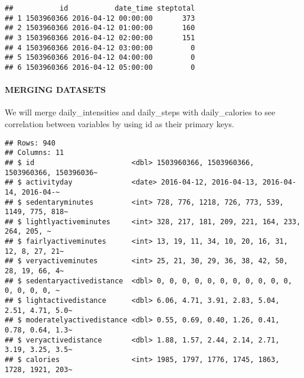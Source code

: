 \documentclass[
]{article}
\newenvironment{Shaded}{\begin{snugshade}}{\end{snugshade}}
\newcommand{\AttributeTok}[1]{\textcolor[rgb]{0.13,0.29,0.53}{#1}}
\newcommand{\FunctionTok}[1]{\textcolor[rgb]{0.13,0.29,0.53}{\textbf{#1}}}
\newcommand{\NormalTok}[1]{#1}
\newcommand{\OtherTok}[1]{\textcolor[rgb]{0.56,0.35,0.01}{#1}}
\newcommand{\SpecialCharTok}[1]{\textcolor[rgb]{0.81,0.36,0.00}{\textbf{#1}}}
\newcommand{\StringTok}[1]{\textcolor[rgb]{0.31,0.60,0.02}{#1}}
\begin{document}
\begin{verbatim}
##           id           date_time steptotal
## 1 1503960366 2016-04-12 00:00:00       373
## 2 1503960366 2016-04-12 01:00:00       160
## 3 1503960366 2016-04-12 02:00:00       151
## 4 1503960366 2016-04-12 03:00:00         0
## 5 1503960366 2016-04-12 04:00:00         0
## 6 1503960366 2016-04-12 05:00:00         0
\end{verbatim}

\hypertarget{merging-datasets}{%
\paragraph{MERGING DATASETS}\label{merging-datasets}}

We will merge daily\_intensities and daily\_steps with daily\_calories
to see correlation between variables by using id as their primary keys.

\begin{Shaded}
\end{Shaded}

\begin{verbatim}
## Rows: 940
## Columns: 11
## $ id                       <dbl> 1503960366, 1503960366, 1503960366, 150396036~
## $ activityday              <date> 2016-04-12, 2016-04-13, 2016-04-14, 2016-04-~
## $ sedentaryminutes         <int> 728, 776, 1218, 726, 773, 539, 1149, 775, 818~
## $ lightlyactiveminutes     <int> 328, 217, 181, 209, 221, 164, 233, 264, 205, ~
## $ fairlyactiveminutes      <int> 13, 19, 11, 34, 10, 20, 16, 31, 12, 8, 27, 21~
## $ veryactiveminutes        <int> 25, 21, 30, 29, 36, 38, 42, 50, 28, 19, 66, 4~
## $ sedentaryactivedistance  <dbl> 0, 0, 0, 0, 0, 0, 0, 0, 0, 0, 0, 0, 0, 0, 0, ~
## $ lightactivedistance      <dbl> 6.06, 4.71, 3.91, 2.83, 5.04, 2.51, 4.71, 5.0~
## $ moderatelyactivedistance <dbl> 0.55, 0.69, 0.40, 1.26, 0.41, 0.78, 0.64, 1.3~
## $ veryactivedistance       <dbl> 1.88, 1.57, 2.44, 2.14, 2.71, 3.19, 3.25, 3.5~
## $ calories                 <int> 1985, 1797, 1776, 1745, 1863, 1728, 1921, 203~
\end{verbatim}
\end{document}
